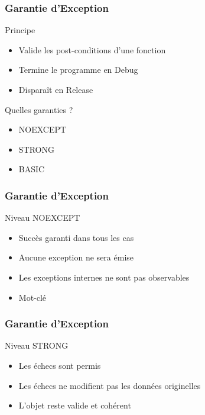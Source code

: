 \documentclass[svgnames]{beamer}
\begin{document}
\frame
{
  \frametitle{Garantie d'Exception}
  \begin{block}{Principe}
  \begin{itemize}
  \item Valide les \alert{post-conditions} d'une fonction
  \item Termine le programme en Debug
  \item Disparaît en Release
  \end{itemize}
  \end{block}
  
  \begin{block}{Quelles garanties ?}
  \begin{itemize}
  \item NOEXCEPT
  \item STRONG 
  \item BASIC
  \end{itemize}
  \end{block}
}


\frame
{
  \frametitle{Garantie d'Exception}
  \begin{block}{Niveau NOEXCEPT}
  \begin{itemize}
  \item Succès garanti dans tous les cas
  \item Aucune exception ne sera émise
  \item Les exceptions internes ne sont pas observables
  \item Mot-clé 
  \end{itemize}
  \end{block}

  \begin{overlayarea}{\textwidth}{3cm}
  \end{overlayarea}
}

\frame
{
  \frametitle{Garantie d'Exception}
  \begin{block}{Niveau STRONG}
  \begin{itemize}
  \item Les échecs sont permis
  \item Les échecs ne modifient pas les données originelles
  \item L'objet reste valide et cohérent
  \end{itemize}
  \end{block}
}
\end{document}
